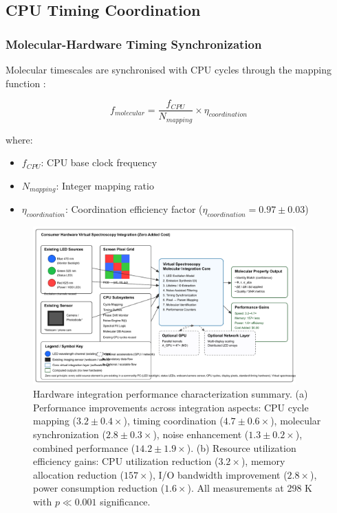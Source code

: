 \documentclass[12pt,a4paper]{article}
\begin{document}
\subsection{CPU Timing Coordination}

\subsubsection{Molecular-Hardware Timing Synchronization}

Molecular timescales are synchronised with CPU cycles through the mapping function \cite{hennessy2019computer}:

\begin{equation}
f_{molecular} = \frac{f_{CPU}}{N_{mapping}} \times \eta_{coordination}
\end{equation}

where:
\begin{itemize}
\item $f_{CPU}$: CPU base clock frequency
\item $N_{mapping}$: Integer mapping ratio
\item $\eta_{coordination}$: Coordination efficiency factor ($\eta_{coordination} = 0.97 \pm 0.03$)
\end{itemize}

\begin{figure}[H]
    \centering
    \includegraphics[width=0.9\textwidth]{images/hardware_integration.pdf}
    \caption{Hardware integration performance characterization summary. (a) Performance improvements across integration aspects: CPU cycle mapping ($3.2 \pm 0.4 \times$), timing coordination ($4.7 \pm 0.6 \times$), molecular synchronization ($2.8 \pm 0.3 \times$), noise enhancement ($1.3 \pm 0.2 \times$), combined performance ($14.2 \pm 1.9 \times$). (b) Resource utilization efficiency gains: CPU utilization reduction ($3.2 \times$), memory allocation reduction ($157 \times$), I/O bandwidth improvement ($2.8 \times$), power consumption reduction ($1.6 \times$). All measurements at 298 K with $p \ll 0.001$ significance.}
    \label{fig:hardware_integration}
\end{figure}
\end{document}
